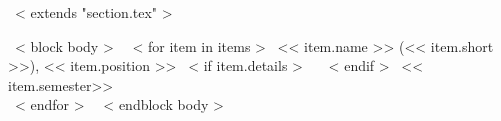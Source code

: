 ~< extends "section.tex" >~

~< block body >~
    ~< for item in items >~
        << item.name >>
        (<< item.short >>),
        << item.position >>
        ~< if item.details >~
            \, {\scriptsize
            \textit{\color{gray}{<< item.details >>}}
          }
        ~< endif >~
        \hfill
        << item.semester>> \\
    ~< endfor >~
~< endblock body >~

